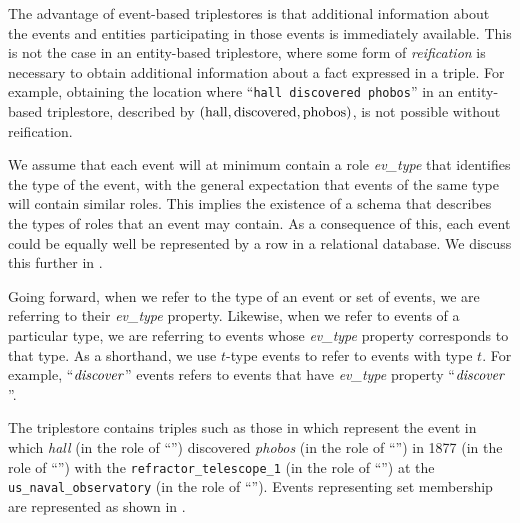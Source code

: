 \documentclass[../main.tex]{subfiles}
\begin{document}
\begin{refsection}
The advantage of event-based triplestores is that additional information about the events and entities participating in those events is immediately available. This is not the case in an entity-based triplestore, where some form of \textit{reification} is necessary to obtain additional information about a fact expressed in a triple.  For example, obtaining the location where ``\texttt{hall discovered phobos}'' in an entity-based triplestore, described by $(\operatorname{hall}, \operatorname{discovered}, \operatorname{phobos})$, is not possible without reification.

We assume that each event will at minimum contain a role \textit{ev\_type} that identifies the type of the event, with the general expectation that events of the same type will contain similar roles.
This implies the existence of a schema that describes the types of roles that an event may contain.  As a consequence of this, each event could be equally well be represented by a row in a relational database.  We discuss this further in .

Going forward, when we refer to the type of an event or set of events, we are referring to their \textit{ev\_type} property.  Likewise, when we refer to events of a particular type, we are referring to events whose \textit{ev\_type} property corresponds to that type.  As a shorthand, we use $t$-type events to refer to events with type $t$.  For example, ``$\operatorname{\mathit{discover}}$'' events refers to events that have \textit{ev\_type} property ``$\operatorname{\mathit{discover}}$''.

The triplestore contains triples such as those in  which represent the event in which \textit{hall} (in the role of ``'') discovered \textit{phobos} (in the role of ``'') in 1877 (in the role of ``'') with the \texttt{refractor\_telescope\_1} (in the role of ``'')  at the \texttt{us\_naval\_observatory} (in the role of ``'').  Events representing set membership are represented as shown in .


\end{refsection}
\end{document}
